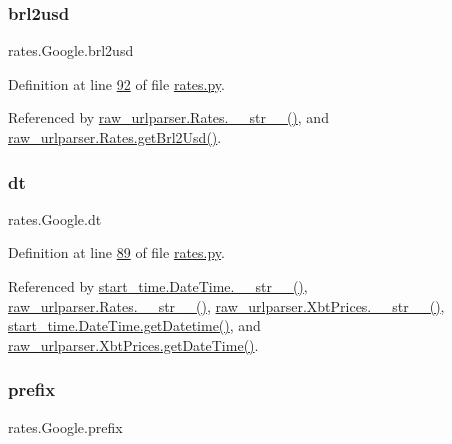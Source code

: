 \subsubsection{\texorpdfstring{brl2usd}{brl2usd}}
{\footnotesize\ttfamily rates.\+Google.\+brl2usd}



Definition at line \hyperlink{rates_8py_source_l00092}{92} of file \hyperlink{rates_8py_source}{rates.\+py}.



Referenced by \hyperlink{raw__urlparser_8py_source_l00038}{raw\+\_\+urlparser.\+Rates.\+\_\+\+\_\+str\+\_\+\+\_\+()}, and \hyperlink{raw__urlparser_8py_source_l00029}{raw\+\_\+urlparser.\+Rates.\+get\+Brl2\+Usd()}.

\mbox{\label{classrates_1_1_google_a76574be36237f78780f76bed53e69ab2}} 
\subsubsection{\texorpdfstring{dt}{dt}}
{\footnotesize\ttfamily rates.\+Google.\+dt}



Definition at line \hyperlink{rates_8py_source_l00089}{89} of file \hyperlink{rates_8py_source}{rates.\+py}.



Referenced by \hyperlink{start__time_2____init_____8py_source_l00034}{start\+\_\+time.\+Date\+Time.\+\_\+\+\_\+str\+\_\+\+\_\+()}, \hyperlink{raw__urlparser_8py_source_l00038}{raw\+\_\+urlparser.\+Rates.\+\_\+\+\_\+str\+\_\+\+\_\+()}, \hyperlink{raw__urlparser_8py_source_l00074}{raw\+\_\+urlparser.\+Xbt\+Prices.\+\_\+\+\_\+str\+\_\+\+\_\+()}, \hyperlink{start__time_2____init_____8py_source_l00031}{start\+\_\+time.\+Date\+Time.\+get\+Datetime()}, and \hyperlink{raw__urlparser_8py_source_l00059}{raw\+\_\+urlparser.\+Xbt\+Prices.\+get\+Date\+Time()}.

\mbox{\label{classrates_1_1_google_ada5de8700ad571d0ab819fa0163d6bbe}} 
\subsubsection{\texorpdfstring{prefix}{prefix}}
{\footnotesize\ttfamily rates.\+Google.\+prefix}



